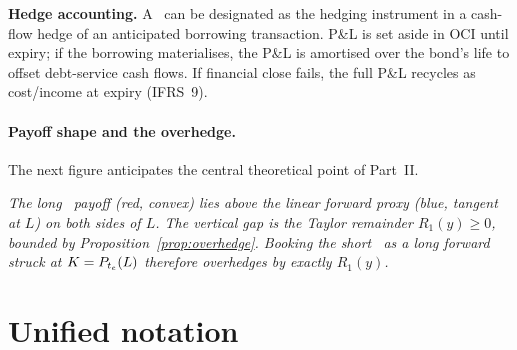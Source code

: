 \documentclass[11pt,a4paper]{article}
\newcommand{\Tlock}{\text{T-Lock}}
\begin{document}
\textbf{Hedge accounting.} A \Tlock\ can be designated as the hedging
instrument in a cash-flow hedge of an anticipated borrowing
transaction. P\&L is set aside in OCI until expiry; if the borrowing
materialises, the P\&L is amortised over the bond's life to offset
debt-service cash flows. If financial close fails, the full P\&L
recycles as cost/income at expiry (IFRS~9).

\paragraph{Payoff shape and the overhedge.} The next figure anticipates
the central theoretical point of Part~II.

\begin{center}
\end{center}
\noindent\textsl{The long \Tlock\ payoff (red, convex) lies above the linear
forward proxy (blue, tangent at $L$) on both sides of $L$. The vertical
gap is the Taylor remainder $R_1(y) \ge 0$, bounded by
Proposition~\ref{prop:overhedge}. Booking the short \Tlock\ as a long
forward struck at $K = P_{t_e}(L)$ therefore overhedges by exactly $R_1(y)$.}

\section{Unified notation}\label{sec:notation}
\end{document}
